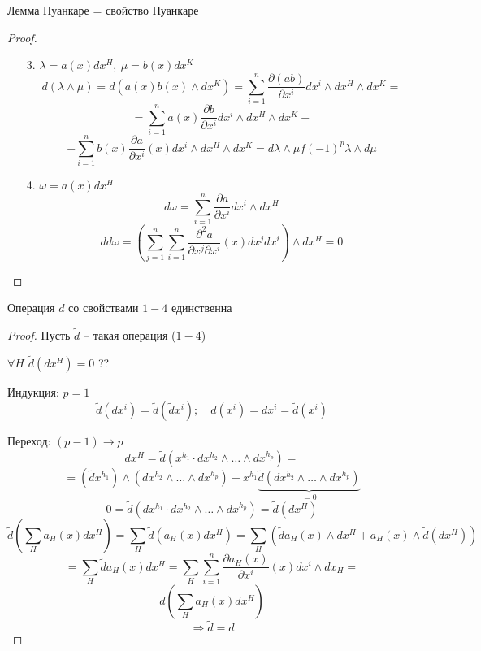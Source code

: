    \begin{lemma*}
        Лемма Пуанкаре = свойство Пуанкаре
    \end{lemma*}

    \begin{proof}
        $ $
        \begin{enumerate}
            \item[3.] $\lambda = a(x) dx^H, \ \mu = b(x)dx^K$
            \[
                d(\lambda \wedge \mu) = d(a(x) b(x) \wedge dx^K) = \sum_{i=1}^n \frac{\partial (ab)}{\partial x^i} dx^i \wedge dx^H \wedge dx^K =  
            \]
            \[
                = \sum_{i = 1}^n a(x) \frac{\partial b}{\partial x^i} dx^i \wedge dx^H \wedge dx^K +    
            \]
            \[
                + \sum_{i=1}^n b(x) \frac{\partial a}{\partial x^i}(x) dx^i \wedge dx^H \wedge dx^K = d\lambda \wedge \mu f (-1)^p \lambda \wedge d\mu   
            \]
            \item[4.] $\omega = a(x) dx^H$
                \[
                    d\omega = \sum_{i=1}^n \frac{\partial a}{\partial x^i} dx^i \wedge dx^H   
                \]
                \[
                    d d \omega = \left(\sum_{j=1}^n\sum_{i=1}^n \frac{\partial^2 a}{\partial x^j \partial x^i}(x) dx^j dx^i \right) \wedge dx^H = 0    
                \]
        \end{enumerate}
    \end{proof}

    \begin{lemma*}
        Операция $d$ со свойствами $1-4$ единственна
    \end{lemma*}

    \begin{proof}
        Пусть $\tilde d$ -- такая операция ($1-4$)
        \par $\forall H$ \quad $\tilde d(dx^H) = 0$ ??
        \par Индукция: \quad $p=1$
        \[
            \tilde d (dx^i) = \tilde d(\tilde d x^i); \quad d(x^i) = dx^i = \tilde d (x^i) 
        \]
        \par Переход: \quad $(p-1) \rightarrow p$
        \[
            dx^H = \tilde d (x^{h_1} \cdot d x^{h_2} \wedge \dots \wedge dx^{h_p}) =
        \]
        \[
            = (\tilde d x^{h_1}) \wedge (dx^{h_2} \wedge \dots \wedge dx^{h_p}) + x^{h_1} \underbrace{\tilde d (dx^{h_2} \wedge \dots \wedge dx^{h_p})}_{= 0}    
        \]
        \[
            0 = \tilde d (d x^{h_1} \cdot dx^{h_2}\wedge \dots \wedge dx^{h_p}) = \tilde d (dx^H)
        \]
        \[
            \tilde d(\sum_H a_H(x) dx^H) = \sum_H \tilde d (a_H(x) dx^H) = \sum_H(\tilde d a_H(x) \wedge dx^H + a_H(x) \wedge \tilde d (d x^H))    
        \]
        \[
             = \sum_H \tilde d a_H(x) dx^H = \sum_H \sum_{i=1}^n \frac{\partial a_H(x)}{\partial x^i}(x) dx^i \wedge dx_H =
        \]
        \[
            d\left( \sum_H a_H(x)dx^H \right)    
        \]
        \[
            \Rightarrow \tilde d = d    
        \]
    \end{proof}

